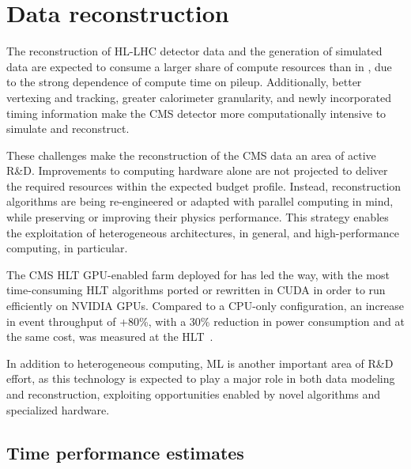 \clearpage

%
%
% 
\section{Data reconstruction}
\label{sec:Reconstruction}

The reconstruction of \gls{HL-LHC} detector data and the generation of simulated data are expected to consume a larger share of compute resources than in \PhaseOne, due to the strong dependence of compute time on pileup. Additionally, better vertexing and tracking, greater calorimeter granularity, and newly incorporated timing information make the \PhaseTwo CMS detector more computationally intensive to simulate and reconstruct.

These challenges make the reconstruction of the CMS \PhaseTwo data an area of active R\&D. Improvements to computing hardware alone are not projected to deliver the required resources within the expected budget profile. Instead, reconstruction algorithms are being re-engineered or adapted with parallel computing in mind, while preserving or improving their physics performance. This strategy enables the exploitation of heterogeneous architectures, in general, and high-performance computing, in particular. 

The CMS \gls{HLT} \gls{GPU}-enabled farm deployed for \RunThree has led the way, with the most time-consuming \gls{HLT} algorithms ported or rewritten in \gls{CUDA} in order to run efficiently on NVIDIA \glspl{GPU}. Compared to a \gls{CPU}-only configuration, an increase in event throughput of +80\%, with a 30\% reduction in power consumption and at the same cost, was measured at the \gls{HLT}~\cite{CMS-DP-2023-004,alpaka:bocci}.  

In addition to heterogeneous computing, \gls{ML} is another important area of R\&D effort, as this technology is expected to play a major role in both data modeling and reconstruction, exploiting opportunities enabled by novel algorithms and specialized hardware.

\subsection{Time performance estimates}

